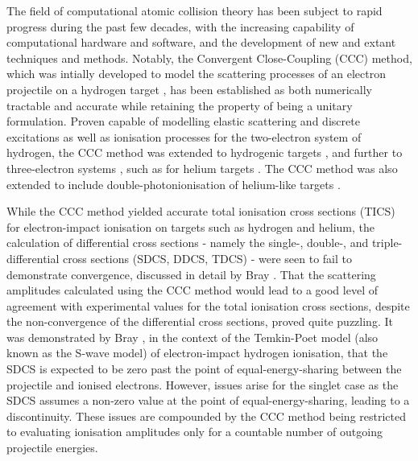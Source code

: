 \documentclass[]{article}
\begin{document}
The field of computational atomic collision theory has been subject to rapid
progress during the past few decades, with the increasing capability of
computational hardware and software, and the development of new and extant
techniques and methods.
Notably, the Convergent Close-Coupling (CCC) method, which was intially
developed to model the scattering processes of an electron projectile on a
hydrogen target \cite{PhysRevA.46.6995}, has been established as both
numerically tractable and accurate while retaining the property of being a
unitary formulation.
Proven capable of modelling elastic scattering and discrete excitations
\cite{PhysRevA.46.6995} as well as ionisation processes
\cite{PhysRevLett.70.746, PhysRevLett.78.4721, PhysRevLett.83.1570} for the
two-electron system of hydrogen, the CCC method was extended to hydrogenic
targets \cite{PhysRevA.49.1066}, and further to three-electron systems
\cite{PhysRevLett.69.53, BRAY19951, PhysRevLett.89.273201}, such as for helium
targets \cite{PhysRevA.52.1279, PhysRevLett.76.2674, Fursa_1997}.
The CCC method was also extended to include double-photonionisation of
helium-like targets \cite{PhysRevA.54.R995, PhysRevA.58.4501, Bray_2002}.

While the CCC method yielded accurate total ionisation cross sections (TICS) for
electron-impact ionisation on targets such as hydrogen and helium, the
calculation of differential cross sections - namely the single-, double-, and
triple-differential cross sections (SDCS, DDCS, TDCS) - were seen to fail to
demonstrate convergence, discussed in detail by Bray \cite{PhysRevLett.78.4721}.
That the scattering amplitudes calculated using the CCC method would lead to a
good level of agreement with experimental values for the total ionisation cross
sections, despite the non-convergence of the differential cross sections, proved
quite puzzling.
It was demonstrated by Bray \cite{PhysRevLett.78.4721}, in the context of the
Temkin-Poet model (also known as the S-wave model) \cite{PhysRev.126.130,
  Poet_1978} of electron-impact hydrogen ionisation, that the SDCS is expected
to be zero past the point of equal-energy-sharing between the projectile and
ionised electrons.
However, issues arise for the singlet case as the SDCS assumes a non-zero value
at the point of equal-energy-sharing, leading to a discontinuity.
These issues are compounded by the CCC method being restricted to evaluating
ionisation amplitudes only for a countable number of outgoing projectile
energies.
\end{document}
